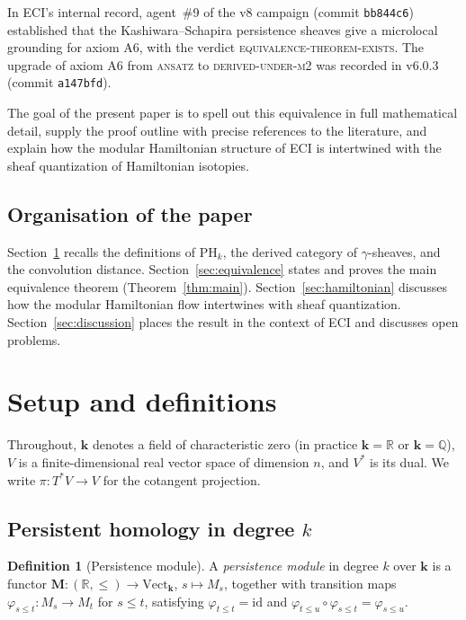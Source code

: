 \documentclass[12pt,a4paper]{amsart}
\theoremstyle{definition}
\newtheorem{definition}[theorem]{Definition}
\newcommand{\R}{\mathbb{R}}
\newcommand{\kk}{\mathbf{k}}                %
\newcommand{\PHk}{\mathrm{PH}_k}            %
\newcommand{\id}{\mathrm{id}}
\begin{document}
In ECI's internal record, agent~\#9 of the v8 campaign (commit
\texttt{bb844c6}) established that the Kashiwara--Schapira persistence
sheaves give a microlocal grounding for axiom A6, with the verdict
\textsc{equivalence-theorem-exists}.  The upgrade of axiom A6 from
\textsc{ansatz} to \textsc{derived-under-m2} was recorded in v6.0.3
(commit \texttt{a147bfd}).

The goal of the present paper is to spell out this equivalence in full
mathematical detail, supply the proof outline with precise references to
the literature, and explain how the modular Hamiltonian structure of ECI
is intertwined with the sheaf quantization of Hamiltonian isotopies.

\subsection*{Organisation of the paper}

Section~\ref{sec:setup} recalls the definitions of $\PHk$, the derived
category of $\gamma$-sheaves, and the convolution distance.
Section~\ref{sec:equivalence} states and proves the main equivalence
theorem (Theorem~\ref{thm:main}).  Section~\ref{sec:hamiltonian}
discusses how the modular Hamiltonian flow intertwines with sheaf
quantization.  Section~\ref{sec:discussion} places the result in the
context of ECI and discusses open problems.

\section{Setup and definitions}
\label{sec:setup}

Throughout, $\kk$ denotes a field of characteristic zero (in practice
$\kk = \R$ or $\kk = \mathbb{Q}$), $V$ is a finite-dimensional real
vector space of dimension $n$, and $V^*$ is its dual.  We write
$\pi: T^*V \to V$ for the cotangent projection.

\subsection{Persistent homology in degree \texorpdfstring{$k$}{k}}

\begin{definition}[Persistence module]
  \label{def:persistence-module}
  A \emph{persistence module} in degree $k$ over $\kk$ is a functor
  $\mathbf{M}: (\R, \leq) \to \mathrm{Vect}_\kk$, $s \mapsto M_s$,
  together with transition maps $\varphi_{s \leq t}: M_s \to M_t$ for
  $s \leq t$, satisfying $\varphi_{t \leq t} = \id$ and
  $\varphi_{t \leq u} \circ \varphi_{s \leq t} = \varphi_{s \leq u}$.
\end{definition}
\end{document}
